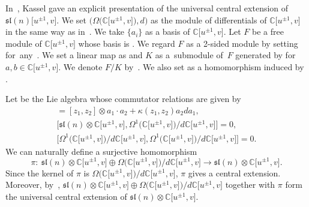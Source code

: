 \documentclass[pdftex]{sigma}
\numberwithin{equation}{section}
\theoremstyle{definition}
\begin{document}
In~\cite{Kassel}, Kassel gave an explicit presentation of the universal central extension of $\mathfrak{sl}(n)\bigl[u^{\pm1},v\bigr]$.
We set $\bigl(\Omega\bigl(\mathbb{C}\bigl[u^{\pm1},v\bigr]\bigr),d\bigr)$ as the module of differentials of $\mathbb{C}\bigl[u^{\pm1},v\bigr]$ in the same way as in~\cite[Section~2]{MRY}. We take $\{a_i\}$ as a basis of $\mathbb{C}\bigl[u^{\pm1},v\bigr]$. Let $F$ be a free module of $\mathbb{C}\bigl[u^{\pm1},v\bigr]$ whose basis is . We regard $F$ as a 2-sided  module by setting  for~any~. We set a linear map  as  and $K$ as a~submodule of~$F$ generated by  for $a,b\in\mathbb{C}\bigl[u^{\pm1},v\bigr]$. We denote $F/K$ by~. We also set  as a homomorphism induced by .

Let  be the Lie algebra whose commutator relations are given by
\begin{gather*}
[z_1\otimes a_1,z_2\otimes a_2]=[z_1,z_2]\otimes a_1\cdot a_2+\kappa(z_1,z_2)a_2da_1,\\
\bigl[\mathfrak{sl}(n)\otimes\mathbb{C}\bigl[u^{\pm1},v\bigr],\Omega^1\bigl(\mathbb{C}\bigl[u^{\pm1},v\bigr]\bigr)/d\mathbb{C}\bigl[u^{\pm1},v\bigr]\bigr]=0,\\
\bigl[\Omega^1\bigl(\mathbb{C}\bigl[u^{\pm1},v\bigr]\bigr)/d\mathbb{C}\bigl[u^{\pm1},v\bigr],\Omega^1\bigl(\mathbb{C}\bigl[u^{\pm1},v\bigr]\bigr)/d\mathbb{C}\bigl[u^{\pm1},v\bigr]\bigr]=0.
\end{gather*}
We can naturally define a surjective homomorphism
\[
\pi\colon\ \mathfrak{sl}(n)\otimes\mathbb{C}\bigl[u^{\pm1},v\bigr]\oplus\Omega\bigl(\mathbb{C}\bigl[u^{\pm1},v\bigr]\bigr) / d\mathbb{C}\bigl[u^{\pm1},v\bigr]\to\mathfrak{sl}(n)\otimes\mathbb{C}\bigl[u^{\pm1},v\bigr].
\]
Since the kernel of $\pi$ is $\Omega\bigl(\mathbb{C}\bigl[u^{\pm1},v\bigr]\bigr)/d\mathbb{C}\bigl[u^{\pm1},v\bigr]$, $\pi$ gives a central extension.
Moreover, by~\cite{Kassel}, $\mathfrak{sl}(n)\otimes\mathbb{C}\bigl[u^{\pm1},v\bigr]\oplus\Omega \bigl(\mathbb{C}\bigl[u^{\pm1},v\bigr]\bigr)/d\mathbb{C}\bigl[u^{\pm1},v\bigr]$ together with $\pi$ form the universal central extension of $\mathfrak{sl}(n)\otimes\mathbb{C}\bigl[u^{\pm1},v\bigr]$.
\end{document}
